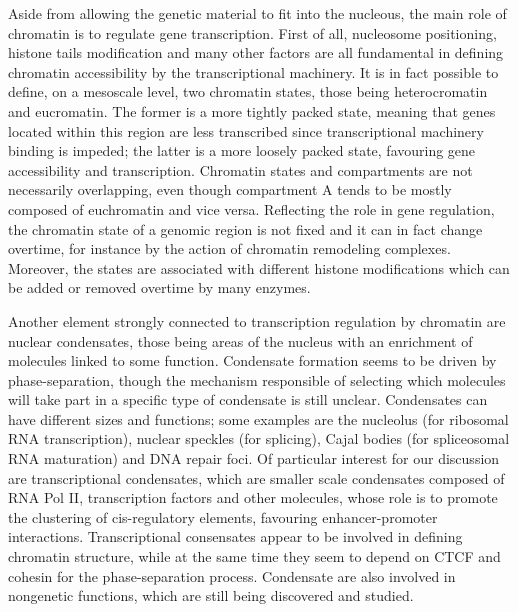Aside from allowing the genetic material to fit into the nucleous, the main role of chromatin is to regulate gene transcription. First of all, nucleosome positioning, histone tails modification and many other factors are all fundamental in defining chromatin accessibility by the transcriptional machinery\cite{chromatinfiber2015, histonemodification2007}. It is in fact possible to define, on a mesoscale level, two chromatin states, those being heterocromatin and eucromatin. The former is a more tightly packed state, meaning that genes located within this region are less transcribed since transcriptional machinery binding is impeded; the latter is a more loosely packed state, favouring gene accessibility and transcription\cite{heterochromatin2020}. Chromatin states and compartments are not necessarily overlapping, even though compartment A tends to be mostly composed of euchromatin and vice versa. Reflecting the role in gene regulation, the chromatin state of a genomic region is not fixed and it can in fact change overtime, for instance by the action of chromatin remodeling complexes\cite{chromatinremodeling2021}. Moreover, the states are associated with different histone modifications which can be added or removed overtime by many enzymes\cite{histonemodifications2020, epigeneticbook2020}.

Another element strongly connected to transcription regulation by chromatin are nuclear condensates, those being areas of the nucleus with an enrichment of molecules linked to some function\cite{condensates2023}. Condensate formation seems to be driven by phase-separation, though the mechanism responsible of selecting which molecules will take part in a specific type of condensate is still unclear\cite{phaseseparation2022}. Condensates can have different sizes and functions; some examples are the nucleolus (for ribosomal RNA transcription), nuclear speckles (for splicing), Cajal bodies (for spliceosomal RNA maturation) and DNA repair foci\cite{condensatetypes2020}. Of particular interest for our discussion are transcriptional condensates, which are smaller scale condensates composed of RNA Pol II, transcription factors and other molecules, whose role is to promote the clustering of cis-regulatory elements, favouring enhancer-promoter interactions\cite{condensatecomposition2018, condensateenhancer2018}. Transcriptional consensates appear to be involved in defining chromatin structure, while at the same time they seem to depend on CTCF and cohesin for the phase-separation process\cite{condensatectcf2022, condensatecohesin2021}. Condensate are also involved in nongenetic functions, which are still being discovered and studied\cite{condensates2023}.

